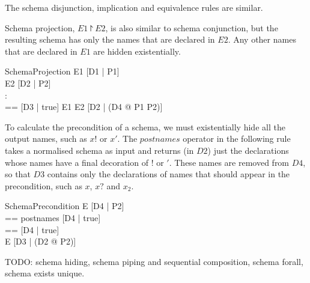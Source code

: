 \documentclass{entcs}
\newcommand{\sexprUnfoldsTo}{\mathrel{=_{se}}}
\newcommand{\schemaEquals}{\mathrel{=_S}}
\begin{document}
The schema disjunction, implication and equivalence rules are similar.

Schema projection, $E1 \project E2$, is also similar to schema conjunction,
but the resulting schema has only the names that are declared in $E2$.
Any other names that are declared in $E1$ are hidden existentially.

\begin{zedrule}{SchemaProjection}
  E1 \sexprUnfoldsTo [D1 | P1] \\
  E2 \sexprUnfoldsTo [D2 | P2] \\
  \proviso [D1 | true] \land [D2 | true] : \power [D3] \\
  \proviso [D4 | true] == [D3 | true] \schemaminus [D2 | true]
\derives
  E1 \project E2 \sexprUnfoldsTo [D2 | (\exists D4 @ P1 \land P2)]
\end{zedrule}

To calculate the precondition of a schema, we must existentially
hide all the output names, such as $x!$ or $x'$.  The $postnames$ 
operator in the following rule takes a normalised schema as input and
returns (in $D2$) just the declarations whose names have a final decoration 
of $!$ or $'$.  These names are removed from $D4$, so that $D3$ contains 
only the declarations of names that should appear in the precondition, 
such as $x$, $x?$ and $x_2$.

\begin{zedrule}{SchemaPrecondition}
  E \sexprUnfoldsTo [D4 | P2] \\
  \proviso [D2 | true] == postnames [D4 | true] \\
  \proviso [D3 | true] == [D4 | true] \schemaminus [D2 | true] \\
\derives
  \pre E \sexprUnfoldsTo [D3 | (\exists D2 @ P2)]
\end{zedrule}

TODO: schema hiding, schema piping and sequential composition,
schema forall, schema exists unique.


%
\end{document}
